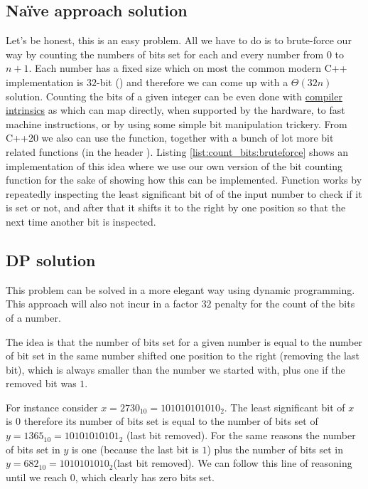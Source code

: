 \subsection{Na\"ive approach solution}
\label{count_bits:sec:bruteforce}
Let's be honest, this is an easy problem. All we have to do is to brute-force our way by counting
the numbers of bits set for each and every number from $0$ to $n+1$. Each number has a fixed size
which on most the common modern C++ implementation is $32$-bit () and therefore
we can come up with a $\Theta(32n)$ solution. Counting the bits of a given integer can be even done
with
\href{https://gcc.gnu.org/onlinedocs/gcc-4.9.2/gcc/X86-Built-in-Functions.html}{compiler intrinsics}
as  which can map directly, when supported by the hardware, to fast
machine instructions, or by using some simple bit manipulation trickery. From C++20 we also can use
the  function, together with a bunch of lot more bit related functions (in the
header ). Listing \ref{list:count_bits:bruteforce} shows an implementation of this
idea where we use our own version of the bit counting function  for the sake of
showing how this can be implemented. Function  works by repeatedly inspecting
the least significant bit of of the input number to check if it is set or not, and after that it
shifts it to the right by one position so that the next time another bit is inspected.


\subsection{DP solution}
\label{count_bits:sec:dp}
This problem can be solved in a more elegant way using dynamic programming. This approach will also
not incur in a factor $32$ penalty for the count of the bits of a number.

The idea is that the number of bits set for a given number is equal to the number of bit set in the
same number shifted one position to the right (removing the last bit), which is always smaller than
the number we started with, plus one if the removed bit was $1$.

For instance consider $x=2730_{10} = 101010101010_2$. The least significant bit of $x$ is $0$
therefore its number of bits set is equal to the number of bits set of $y=1365_{10} = 10101010101_2$
(last bit removed). For the same reasons the number of bits set in $y$ is one (because the last bit
is $1$) plus the number of bits set in $y=682_{10} = 1010101010_2$(last bit removed). We can follow
this line of reasoning until we reach $0$, which clearly has zero bits set.

